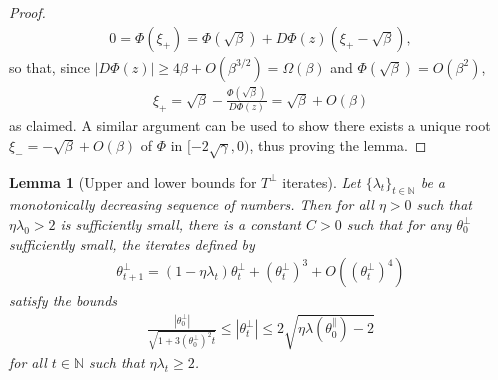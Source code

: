 \documentclass{article}
\newcommand{\NB}{\mathbb{N}}
\newcommand{\tpa}{\theta^{\parallel}}
\newcommand{\tpe}{\theta^{\perp}}
\theoremstyle{plain}
\newtheorem{lemma}[theorem]{Lemma}
\theoremstyle{definition}
\theoremstyle{remark}
\begin{document}
\begin{proof}
    \begin{align}
        0 = \Phi(\xi_+) = \Phi(\sqrt{\beta}) + D\Phi(z)(\xi_+-\sqrt{\beta}),
    \end{align}
    so that, since $|D\Phi(z)|\geq 4\beta + O(\beta^{3/2}) = \Omega(\beta)$ and $\Phi(\sqrt{\beta}) = O(\beta^2)$,
    \begin{align}
        \xi_+ = \sqrt{\beta} - \frac{\Phi(\sqrt{\beta})}{D\Phi(z)} = \sqrt{\beta} + O(\beta)
    \end{align}
    as claimed. A similar argument can be used to show there exists a unique root $\xi_- = -\sqrt{\beta}+O(\beta)$ of $\Phi$ in $[-2\sqrt{\gamma},0)$, thus proving the lemma.
\end{proof}

\begin{lemma}[Upper and lower bounds for $T^{\perp}$ iterates]\label{lem:ulboundsperp}
    Let $\{\lambda_t\}_{t\in\NB}$ be a monotonically decreasing sequence of numbers. Then for all $\eta>0$ such that $\eta\lambda_0>2$ is sufficiently small, there is a constant $C>0$ such that for any $\tpe_0$ sufficiently small, the iterates defined by
    \begin{align}
        \tpe_{t+1} = (1-\eta\lambda_t)\tpe_t+(\tpe_t)^3 + O((\tpe_t)^4)\label{eq:tpet+1}
    \end{align}
    satisfy the bounds
    \begin{align}
        \frac{|\tpe_0|}{\sqrt{1+3(\tpe_0)^2t}}\leq |\tpe_t|\leq 2\sqrt{\eta\lambda(\tpa_0)-2}\label{eq:tpebounds}
    \end{align}
    for all $t\in\NB$ such that $\eta\lambda_t\geq 2$.
\end{lemma}
\end{document}
